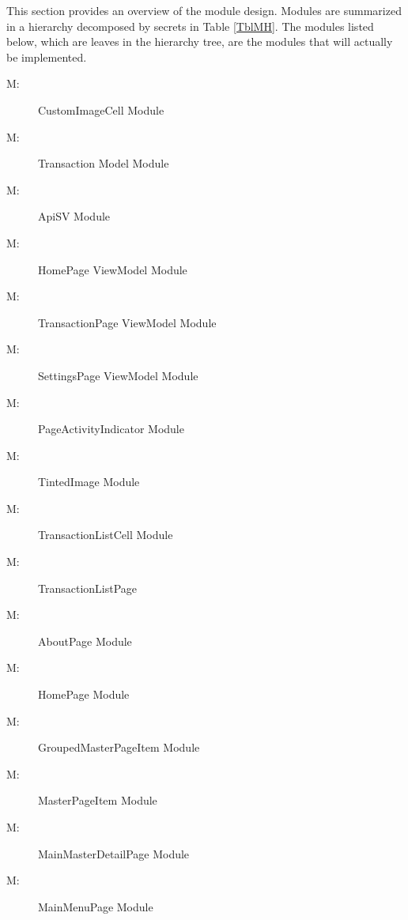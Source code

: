 \documentclass[12pt, titlepage]{article}
\newcounter{mnum}
\newcommand{\mthemnum}{M\themnum}
\begin{document}
This section provides an overview of the module design. Modules are summarized
in a hierarchy decomposed by secrets in Table \ref{TblMH}. The modules listed
below, which are leaves in the hierarchy tree, are the modules that will
actually be implemented.

\begin{description}
\item [ \mthemnum \label{m1}:] CustomImageCell Module
\item [ \mthemnum \label{m2}:] Transaction Model Module
\item [ \mthemnum \label{m3}:] ApiSV Module
\item [ \mthemnum \label{m4}:] HomePage ViewModel Module
\item [ \mthemnum \label{m5}:] TransactionPage ViewModel Module
\item [ \mthemnum \label{m6}:] SettingsPage ViewModel Module
\item [ \mthemnum \label{m7}:] PageActivityIndicator Module
\item [ \mthemnum \label{m8}:] TintedImage Module
\item [ \mthemnum \label{m9}:] TransactionListCell Module
\item [ \mthemnum \label{m10}:] TransactionListPage
\item [ \mthemnum \label{m11}:] AboutPage Module
\item [ \mthemnum \label{m12}:] HomePage Module
\item [ \mthemnum \label{m13}:] GroupedMasterPageItem Module
\item [ \mthemnum \label{m14}:] MasterPageItem Module
\item [ \mthemnum \label{m15}:] MainMasterDetailPage Module
\item [ \mthemnum \label{m16}:] MainMenuPage Module
\end{description}
\end{document}
